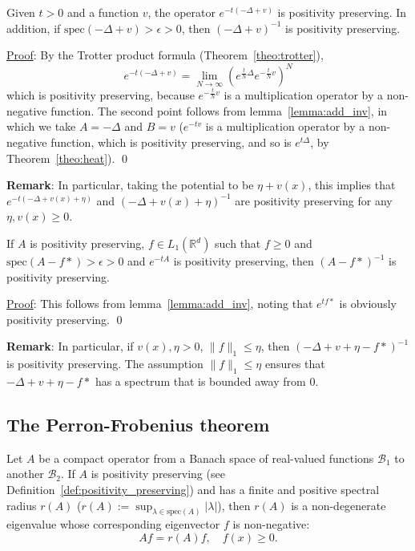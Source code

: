 \documentclass{ian}
\begin{document}
\label{theo:schrodinger}
  Given $t>0$ and a function $v$, the operator $e^{-t(-\Delta+v)}$ is positivity preserving.
  In addition, if $\mathrm{spec}(-\Delta+v)>\epsilon>0$, then $(-\Delta+v)^{-1}$ is positivity preserving.
\endtheo
\bigskip

\indent\underline{Proof}:
  By the Trotter product formula (Theorem\-~\ref{theo:trotter}),
  \begin{equation}
    e^{-t(-\Delta+v)}
    =
    \lim_{N\to\infty}(e^{\frac tN\Delta}e^{-\frac tNv})^N
  \end{equation}
  which is positivity preserving, because $e^{-\frac tNv}$ is a multiplication operator by a non-negative function.
  The second point follows from lemma\-~\ref{lemma:add_inv}, in which we take $A=-\Delta$ and $B=v$ ($e^{-tv}$ is a multiplication operator by a non-negative function, which is positivity preserving, and so is $e^{t\Delta}$, by Theorem\-~\ref{theo:heat}).
\qed
\bigskip

{\bf Remark}: In particular, taking the potential to be $\eta+v(x)$, this implies that $e^{-t(-\Delta+v(x)+\eta)}$ and $(-\Delta+v(x)+\eta)^{-1}$ are positivity preserving for any $\eta,v(x)\geqslant 0$.
\bigskip

\label{lemma:conv}
  If $A$ is positivity preserving, $f\in L_1(\mathbb R^d)$ such that $f\geqslant 0$ and $\mathrm{spec}(A-f\ast)>\epsilon>0$ and $e^{-tA}$ is positivity preserving, then $(A-f\ast)^{-1}$ is positivity preserving.
\endtheo
\bigskip

\indent\underline{Proof}:
  This follows from lemma\-~\ref{lemma:add_inv}, noting that $e^{tf\ast}$ is obviously positivity preserving.
\qed
\bigskip

{\bf Remark}:
In particular, if $v(x),\eta> 0$, $\|f\|_1\leqslant\eta$, then $(-\Delta+v+\eta-f\ast)^{-1}$ is positivity preserving.
The assumption $\|f\|_1\leqslant\eta$ ensures that $-\Delta+v+\eta-f\ast$ has a spectrum that is bounded away from 0.

\subsection{The Perron-Frobenius theorem}
\label{theo:perron_frobenius}
  Let $A$ be a compact operator from a Banach space of real-valued functions $\mathcal B_1$ to another $\mathcal B_2$.
  If $A$ is positivity preserving (see Definition\-~\ref{def:positivity_preserving}) and has a finite and positive spectral radius $r(A)$ ($r(A):=\sup_{\lambda\in\mathrm{spec}(A)}|\lambda|$), then $r(A)$ is a non-degenerate eigenvalue whose corresponding eigenvector $f$ is non-negative:
  \nopagebreakaftereq
  \begin{equation}
    Af=r(A)f
    ,\quad
    f(x)\geqslant 0
    .
  \end{equation}
\endtheo
\restorepagebreakaftereq
\end{document}
